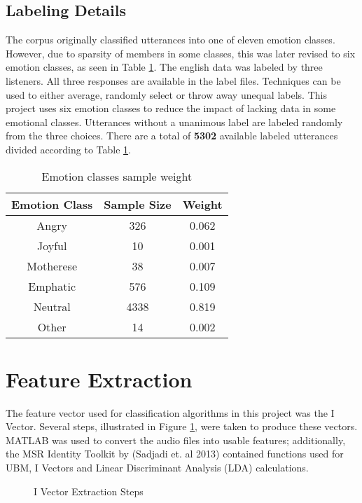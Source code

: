 \subsection{Labeling Details}
	The corpus originally classified utterances into one of eleven emotion classes. However, due to sparsity of members in some classes, this was later revised to six emotion classes, as seen in Table \ref{classesweight}. The english data was labeled by three listeners. All three responses are available in the label files. Techniques can be used to either average, randomly select or throw away unequal labels. This project uses six emotion classes to reduce the impact of lacking data in some emotional classes. Utterances without a unanimous label are labeled randomly from the three choices. There are a total of \textbf{5302} available labeled utterances divided according to Table \ref{classesweight}.
	
	\begin{table}[hbt]
		\caption{Emotion classes sample weight}
		\centering
		\begin{tabular}{|c|c|c|}
			\hline
			Emotion Class & Sample Size & Weight \\ \hline
			Angry         & 326         & 0.062  \\ \hline
			Joyful        & 10          & 0.001  \\ \hline
			Motherese     & 38          & 0.007  \\ \hline
			Emphatic      & 576         & 0.109  \\ \hline
			Neutral       & 4338        & 0.819  \\ \hline
			Other         & 14          & 0.002  \\ \hline
		\end{tabular}
	\label{classesweight}
	\end{table}

\section{Feature Extraction}
	The feature vector used for classification algorithms in this project was the I Vector. Several steps, illustrated in Figure \ref{fig:ivecproc}, were taken to produce these vectors. MATLAB was used to convert the audio files into usable features; additionally, the MSR Identity Toolkit by (Sadjadi et. al 2013) contained functions used for UBM, I Vectors and Linear Discriminant Analysis (LDA) calculations.
	\begin{figure}[!htb]
		\caption{\label{fig:ivecproc} I Vector Extraction Steps}
	\end{figure}

